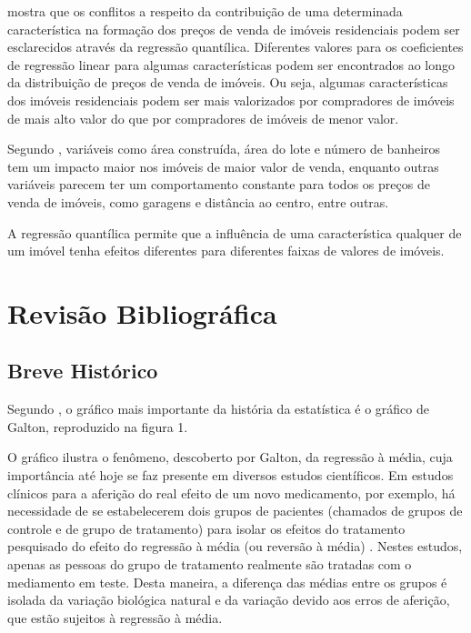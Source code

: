 \documentclass[a4paper, 12pt]{article}
\begin{document}
\textcite{Zietz} mostra que os conflitos a respeito da contribuição de
uma determinada característica na formação dos preços de venda de
imóveis residenciais podem ser esclarecidos através da regressão
quantílica. Diferentes valores para os coeficientes de regressão linear
para algumas características podem ser encontrados ao longo da
distribuição de preços de venda de imóveis. Ou seja, algumas
características dos imóveis residenciais podem ser mais valorizados por
compradores de imóveis de mais alto valor do que por compradores de
imóveis de menor valor.

Segundo \textcite{Zietz}, variáveis como área construída, área do lote e
número de banheiros tem um impacto maior nos imóveis de maior valor de
venda, enquanto outras variáveis parecem ter um comportamento constante
para todos os preços de venda de imóveis, como garagens e distância ao
centro, entre outras.

A regressão quantílica permite que a influência de uma característica
qualquer de um imóvel tenha efeitos diferentes para diferentes faixas de
valores de imóveis.

\hypertarget{revisao-bibliografica}{%
\section{Revisão Bibliográfica}\label{revisao-bibliografica}}

\hypertarget{breve-historico}{%
\subsection{Breve Histórico}\label{breve-historico}}

Segundo \textcite[p.~347]{koenker2000}, o gráfico mais importante da
história da estatística é o gráfico de Galton, reproduzido na figura 1.

O gráfico ilustra o fenômeno, descoberto por Galton, da regressão à
média, cuja importância até hoje se faz presente em diversos estudos
científicos. Em estudos clínicos para a aferição do real efeito de um
novo medicamento, por exemplo, há necessidade de se estabelecerem dois
grupos de pacientes (chamados de grupos de controle e de grupo de
tratamento) para isolar os efeitos do tratamento pesquisado do efeito do
regressão à média (ou reversão à média) \autocite[ver][]{james1973}.
Nestes estudos, apenas as pessoas do grupo de tratamento realmente são
tratadas com o mediamento em teste. Desta maneira, a diferença das
médias entre os grupos é isolada da variação biológica natural e da
variação devido aos erros de aferição, que estão sujeitos à regressão à
média.
\end{document}
